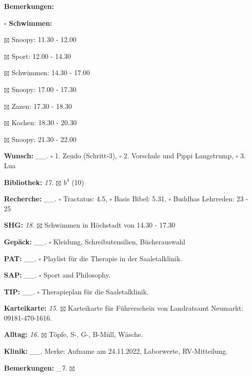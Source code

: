 \documentclass[10pt,a4paper]{article}
\newcounter{notec}
\newcommand\prop[1] {{\color {alizarin} {\bf #1}}}             %
\newcommand\opti[1] {{\color {amethyst} {\bf #1}}}             %
\newcommand\mand[1] {{\color {burntorange} {\bf #1}}}          %
\newcommand\bottomspace{\vskip 4pt}
\newcommand\n[1] { {\sl #1.} \hskip 5pt }
\begin{document}
\begin{mdframed}[style=daystyle]
\begin{labeling}{{\mand {Bemerkungen:}}}
\begin{minipage}{0.75\textwidth}
\begin{labeling}{\prop {$\square$ {Schwimmen:}}}
      \item[$\boxtimes$ Snoopy:]     11.30 - 12.00
      \item[$\boxtimes$ Sport:]      12.00 - 14.30
      \item[$\boxtimes$ Schwimmen:]  14.30 - 17.00
      \item[$\boxtimes$ Snoopy:]     17.00 - 17.30
      \item[$\boxtimes$ Zazen:]      17.30 - 18.30
      \item[$\boxtimes$ Kochen:]     18.30 - 20.30
      \item[$\boxtimes$ Snoopy:]     21.30 - 22.00
      \end{labeling}
    \end{minipage}
    \bottomspace
  \item[{\mand {Wunsch:}}]       \n{\_\_} $\square$ 1. Zendo (Schritt-3),
      $\square$ 2. Vorschule und Pippi Langstrump, $\square$ 3. Lua
  \item[{\mand {Bibliothek:}}]     \n{17} $\boxtimes$ $b^{4}$ (10)
  \item[{\mand {Recherche:}}]    \n{\_\_} $\square$ Tractatus: 4.5, $\square$ Basis Bibel: 5.31,
      $\square$ Buddhas Lehrreden: 23 - 25
  \item[{\mand {SHG:}}]            \n{18} $\boxtimes$ Schwimmen in Höchstadt von 14.30 - 17.30
  \item[{\mand {Gepäck:}}]       \n{\_\_} $\square$ Kleidung, Schreibutensilien, Bücherauswahl
  \item[{\opti {PAT:}}]          \n{\_\_} $\square$ Playlist für die Therapie in der Saaletalklinik.
  \item[{\opti {SAP:}}]          \n{\_\_} $\square$ Sport and Philosophy.
  \item[{\opti {TIP:}}]          \n{\_\_} $\square$ Therapieplan für die Saaletalklinik.
  \item[{\opti {Karteikarte:}}]    \n{15} $\boxtimes$ Karteikarte für Führerschein von Landratsamt
      Neumarkt: 09181-470-1616.
  \item[{\opti {Alltag:}}]         \n{16} $\boxtimes$ Töpfe, S-, G-, B-Müll, Wäsche.
  \item[{\opti {Klinik:}}]       \n{\_\_} Merke: Aufname am 24.11.2022, Laborwerte, RV-Mitteilung.
  \item[{\mand {Bemerkungen:}}]   \n{\_7} $\boxtimes$
  \end{labeling}
    
  \setcounter{notec}{0}
  

\end{mdframed}
\end{document}
